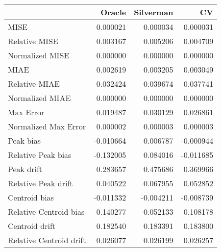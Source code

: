 \begin{tabular}{lrrr}
  \hline
 & Oracle & Silverman & CV \\ 
  \hline
MISE & 0.000021 & 0.000034 & 0.000031 \\ 
  Relative MISE & 0.003167 & 0.005206 & 0.004709 \\ 
  Normalized MISE & 0.000000 & 0.000000 & 0.000000 \\ 
  MIAE & 0.002619 & 0.003205 & 0.003049 \\ 
  Relative MIAE & 0.032424 & 0.039674 & 0.037741 \\ 
  Normalized MIAE & 0.000000 & 0.000000 & 0.000000 \\ 
  Max Error & 0.019487 & 0.030129 & 0.026861 \\ 
  Normalized Max Error & 0.000002 & 0.000003 & 0.000003 \\ 
  Peak bias & -0.010664 & 0.006787 & -0.000944 \\ 
  Relative Peak bias & -0.132005 & 0.084016 & -0.011685 \\ 
  Peak drift & 0.283657 & 0.475686 & 0.369966 \\ 
  Relative Peak drift & 0.040522 & 0.067955 & 0.052852 \\ 
  Centroid bias & -0.011332 & -0.004211 & -0.008739 \\ 
  Relative Centroid bias & -0.140277 & -0.052133 & -0.108178 \\ 
  Centroid drift & 0.182540 & 0.183391 & 0.183800 \\ 
  Relative Centroid drift & 0.026077 & 0.026199 & 0.026257 \\ 
   \hline
\end{tabular}
